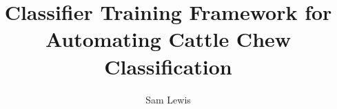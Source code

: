 \makeatletter
\title{Classifier Training Framework for Automating Cattle Chew Classification} \let\Title\@title
\author{Sam Lewis} \let\Author\@author
{}  %
\makeatother

\renewcommand{\degreetext}{in partial fulfilment of the Degree Bachelor of Engineering  \\ in the discipline of Electrical Engineering}

\titlepage





\tableofcontents
\listoffigures
\listoftables

